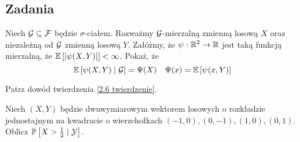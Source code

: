 \subsection{Zadania}

\begin{problem}
Niech $\mathcal{G}\subseteq\mathcal{F}$ będzie $\sigma$-ciałem. Rozważmy $\mathcal{G}$-mierzalną zmienną losową $X$ oraz niezależną od $\mathcal{G}$ zmienną losową $Y$. Załóżmy, że $\psi:\operatorname{\mathbb{R}}^2\to\operatorname{\mathbb{R}}$ jest taką funkcją mierzalną, że $\expected{|\psi(X, Y)|}<\infty$. Pokaż, że 
$$\expected{\psi(X, Y)}{\set{G}}=\Psi(X)\quad \Psi(x)=\expected{\psi(x, Y)}$$
\end{problem}

\begin{solution}
  Patrz dowód twierdzenia \ref{2.6 twierdzenie}.
\end{solution}

\begin{problem}
  Niech  $(X, Y)$ będzie dwuwymiarowym  wektorem losowych o rozkładzie jednostajnym na kwadracie o wierzchołkach $(-1, 0), (0, -1), (1, 0), (0, 1)$. Oblicz $\prob{X>\frac{1}{2}}{\set{Y}}$.
\end{problem}

